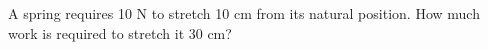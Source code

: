 A spring requires 10 N to stretch 10 cm from its natural position.  How much work is required to stretch it 30 cm?
